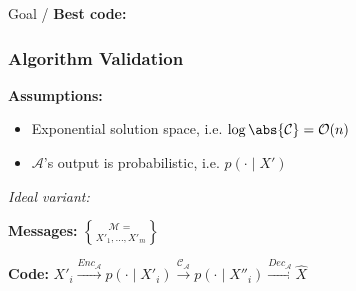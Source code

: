 Goal / \textbf{Best code:}\enspace
{}

\iffalse
    \emph{Asymptotic equiparition property (AEP):}
    \vspace{-2pt}
    \begin{itemize}
        \item $A_\epsilon^{(n)}$:
            Typical set of sequences $(s_1,\ldots,s_n) \in \mathcal S^n$\\\qquad
            $\abs*{-\frac1n \log p_{S^n} (\bm s^n) - H[S]} < \epsilon$\hfill
            $\color{gray} \leftarrow \text{scr. p.89}$
        \item $\P*{(\bm S^n, \bm{\hat S}^n) \in A_\epsilon^{(n)}} \overset{n\to\infty}{\to} 1$\hfill
            $\color{gray} \leftarrow \text{scr. p.90}$
        \item \highlight[algorithm-color]{$p\ped{err} \leq 2^{-n(\mathrm{cap} - 3\epsilon -r)}$}
            $\overset{n\to\infty}{\to} 0$\enspace if\enspace \highlight[algorithm-color]{$r<\mathrm{cap}$}
    \end{itemize}
\fi


\subsubsection{Algorithm Validation}

\textbf{Assumptions:}
\begin{itemize}
    \item Exponential solution space, i.e. $\log\abs{\mathcal C} = \mathcal O(n)$
    \item $\mathcal A$'s output is probabilistic, i.e. $p(\cdot \mid X')$
\end{itemize}

\emph{Ideal variant:}

\textbf{Messages:}\enspace
$\mathcal M = \brace{ X'_1, \ldots, X'_m }$
\vspace{-2pt}

\textbf{Code:}\enspace
$X'_i \xrightarrow{Enc_{\mathcal A}} p(\cdot\mid X'_i)
\xrightarrow{\mathcal{C_A}} p(\cdot\mid X''_i)
\xrightarrow{Dec_{\mathcal A}} \hat X$
\iffalse
    \begin{itemize}
        \item $Enc_{\mathcal A}$:\enspace
            encodes $X'_i \in \mathcal M$ as $p(\cdot\mid X'_i)$.
        \item $Dec_{\mathcal A}$:\enspace
            selects $\hat X = \arg\max\limits_X \kappa(X''_i, X)$\\
            whereby $\kappa(X'', X') \coloneqq \sum_c p(c\mid X'') p(c\mid X')$
    \end{itemize}
\fi

